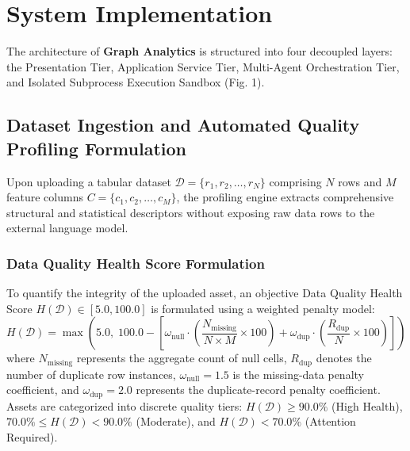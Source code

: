 \documentclass[conference]{IEEEtran}
\begin{document}
\section{System Implementation}

The architecture of \textbf{Graph Analytics} is structured into four decoupled layers: the Presentation Tier, Application Service Tier, Multi-Agent Orchestration Tier, and Isolated Subprocess Execution Sandbox (Fig. 1).

\subsection{Dataset Ingestion and Automated Quality Profiling Formulation}
Upon uploading a tabular dataset $\mathcal{D} = \{r_1, r_2, \dots, r_N\}$ comprising $N$ rows and $M$ feature columns $C = \{c_1, c_2, \dots, c_M\}$, the profiling engine extracts comprehensive structural and statistical descriptors without exposing raw data rows to the external language model.

\subsubsection{Data Quality Health Score Formulation}
To quantify the integrity of the uploaded asset, an objective Data Quality Health Score $H(\mathcal{D}) \in [5.0, 100.0]$ is formulated using a weighted penalty model:
\begin{equation}
H(\mathcal{D}) = \max\left(5.0, \; 100.0 - \left[ \omega_{\text{null}} \cdot \left(\frac{N_{\text{missing}}}{N \times M} \times 100\right) + \omega_{\text{dup}} \cdot \left(\frac{R_{\text{dup}}}{N} \times 100\right) \right]\right)
\end{equation}
where $N_{\text{missing}}$ represents the aggregate count of null cells, $R_{\text{dup}}$ denotes the number of duplicate row instances, $\omega_{\text{null}} = 1.5$ is the missing-data penalty coefficient, and $\omega_{\text{dup}} = 2.0$ represents the duplicate-record penalty coefficient. Assets are categorized into discrete quality tiers: $H(\mathcal{D}) \ge 90.0\%$ (High Health), $70.0\% \le H(\mathcal{D}) < 90.0\%$ (Moderate), and $H(\mathcal{D}) < 70.0\%$ (Attention Required).
\end{document}
